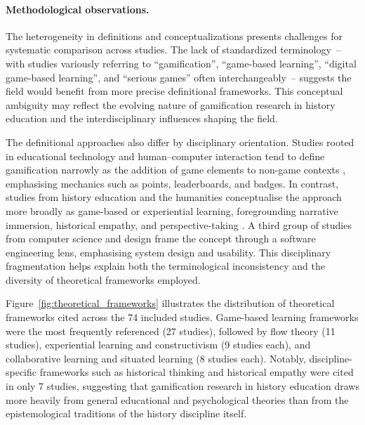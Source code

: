 \documentclass[a4paper,fleqn]{cas-sc}
\begin{document}
\paragraph{Methodological observations.}
The heterogeneity in definitions and conceptualizations presents challenges for systematic comparison across studies. The lack of standardized terminology~-- with studies variously referring to ``gamification'', ``game-based learning'', ``digital game-based learning'', and ``serious games'' often interchangeably~-- suggests the field would benefit from more precise definitional frameworks. This conceptual ambiguity may reflect the evolving nature of gamification research in history education and the interdisciplinary influences shaping the field.

The definitional approaches also differ by disciplinary orientation. Studies rooted in educational technology and human--computer interaction tend to define gamification narrowly as the addition of game elements to non-game contexts \citep{43ali2018indonesian, 36Scholz2021}, emphasising mechanics such as points, leaderboards, and badges. In contrast, studies from history education and the humanities conceptualise the approach more broadly as game-based or experiential learning, foregrounding narrative immersion, historical empathy, and perspective-taking \citep{12Gilbert2019108, 46Stirling2022, 71lynch2015pedagogical}. A third group of studies from computer science and design \citep{22Nugroho2020149, 73Wolfartsberger2011160, 77Ramansyah2021} frame the concept through a software engineering lens, emphasising system design and usability. This disciplinary fragmentation helps explain both the terminological inconsistency and the diversity of theoretical frameworks employed.

Figure~\ref{fig:theoretical_frameworks} illustrates the distribution of theoretical frameworks cited across the 74 included studies. Game-based learning frameworks were the most frequently referenced (27 studies), followed by flow theory (11 studies), experiential learning and constructivism (9 studies each), and collaborative learning and situated learning (8 studies each). Notably, discipline-specific frameworks such as historical thinking and historical empathy were cited in only 7 studies, suggesting that gamification research in history education draws more heavily from general educational and psychological theories than from the epistemological traditions of the history discipline itself.
\end{document}
